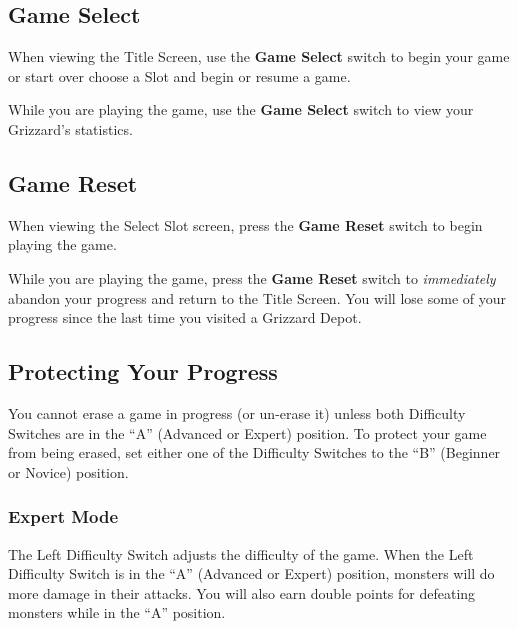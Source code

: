 \documentclass[10pt,twocolumn,openany,article]{memoir}
\begin{document}
\subsection{Game Select}

When viewing  the Title Screen,  use the \textbf{Game Select}  switch to
\ifdefined\NOSAVE begin your game or start  over \else choose a Slot and
begin or resume a game. \fi

While you  are playing the  game, use the  \textbf{Game Select}
switch to view your Grizzard's  statistics.

\ifdefined\ATARIAGESAVE\vfill\pagebreak\fi

\subsection{Game Reset}

When  viewing the  Select  Slot screen,  press  the \textbf{Game  Reset}
switch to begin playing the game.

While you are playing the game,  press the \textbf{Game Reset} switch to
\emph{immediately} abandon your progress and return to the Title Screen.
You will  lose some  of your  progress since the  last time  you visited
a Grizzard Depot.

\ifdefined\ATARIAGESAVE\vfill\fi

\ifdefined\NOSAVE\else

\subsection{Protecting Your Progress}

You  cannot erase  a  game  in progress  (or  un-erase  it) unless  both
Difficulty  Switches are  in the  ``A'' (Advanced  or Expert)  position.
To protect your game from being erased, set either one of the Difficulty
Switches to the ``B'' (Beginner or Novice) position.

\fi

\ifdefined\ATARIAGESAVE\vfill\fi

\subsubsection*{Expert Mode}

The Left Difficulty Switch adjusts the  difficulty of the game. When the
Left Difficulty  Switch is in  the ``A'' (Advanced or  Expert) position,
monsters will do more damage in their attacks. You will also earn double
points for defeating monsters while in the ``A'' position.
\end{document}
